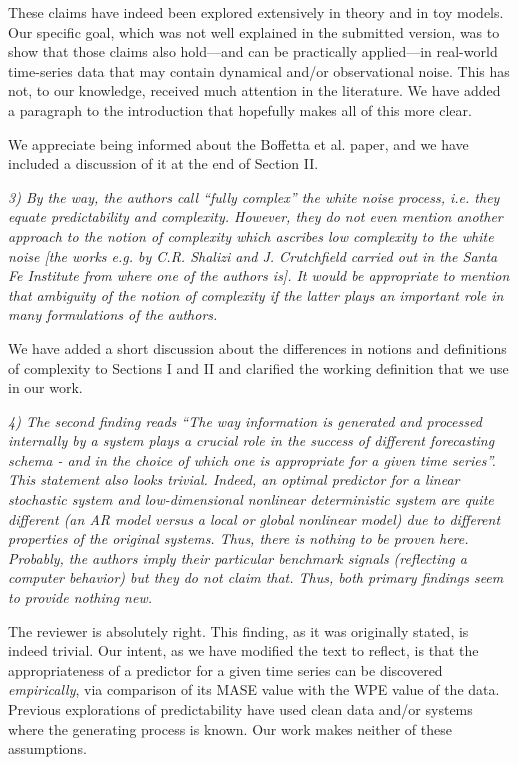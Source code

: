 \documentclass[12pt]{article}
\begin{document}
These claims have indeed been explored extensively in theory and in
toy models.  Our specific goal, which was not well explained in the
submitted version, was to show that those claims also hold---and can
be practically applied---in real-world time-series data that may
contain dynamical and/or observational noise.  This has not, to our
knowledge, received much attention in the literature.  We have added a
paragraph to the introduction that hopefully makes all of this more
clear.

We appreciate being informed about the Boffetta et al.  paper, and we
have included a discussion of it at the end of Section II.

\smallskip

\emph{3) By the way, the authors call ``fully complex'' the white
  noise process, i.e. they equate predictability and
  complexity. However, they do not even mention another approach to
  the notion of complexity which ascribes low complexity to the white
  noise [the works e.g. by C.R. Shalizi and J. Crutchfield carried out
    in the Santa Fe Institute from where one of the authors is]. It
  would be appropriate to mention that ambiguity of the notion of
  complexity if the latter plays an important role in many
  formulations of the authors.}

We have added a short discussion about the differences in notions and
definitions of complexity to Sections I and II and clarified the
working definition that we use in our work.

\smallskip

\emph{4) The second finding reads ``The way information is generated
  and processed internally by a system plays a crucial role in the
  success of different forecasting schema - and in the choice of which
  one is appropriate for a given time series''. This statement also
  looks trivial. Indeed, an optimal predictor for a linear stochastic
  system and low-dimensional nonlinear deterministic system are quite
  different (an AR model versus a local or global nonlinear model) due
  to different properties of the original systems. Thus, there is
  nothing to be proven here. Probably, the authors imply their
  particular benchmark signals (reflecting a computer behavior) but
  they do not claim that.  Thus, both primary findings seem to provide
  nothing new.}

The reviewer is absolutely right.  This finding, as it was originally
stated, is indeed trivial.  Our intent, as we have modified the text
to reflect, is that the appropriateness of a predictor for a given
time series can be discovered \emph{empirically}, via comparison of
its MASE value with the WPE value of the data.  Previous explorations
of predictability have used clean data and/or systems where the
generating process is known.  Our work makes neither of these
assumptions.
\end{document}
